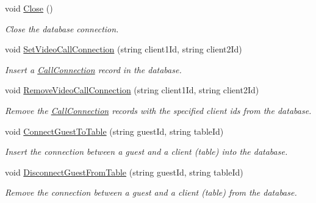 \begin{DoxyCompactItemize}
void \hyperlink{class_e_l_i_server_1_1_database_manager_a7f64bd7fd49cd35e15362d2db5a302e0}{Close} ()
\begin{DoxyCompactList}\small\item\em Close the database connection. \end{DoxyCompactList}\item 
void \hyperlink{class_e_l_i_server_1_1_database_manager_a27bf3444db3446216c2a0c7b957895d9}{Set\+Video\+Call\+Connection} (string client1\+Id, string client2\+Id)
\begin{DoxyCompactList}\small\item\em Insert a \hyperlink{class_e_l_i_server_1_1_call_connection}{Call\+Connection} record in the database. \end{DoxyCompactList}\item 
void \hyperlink{class_e_l_i_server_1_1_database_manager_a8e8315c9b23095cbe799c8f75ccacc87}{Remove\+Video\+Call\+Connection} (string client1\+Id, string client2\+Id)
\begin{DoxyCompactList}\small\item\em Remove the \hyperlink{class_e_l_i_server_1_1_call_connection}{Call\+Connection} records with the specified client ids from the database. \end{DoxyCompactList}\item 
void \hyperlink{class_e_l_i_server_1_1_database_manager_a4167599aa3be67444134c0fd4f837c82}{Connect\+Guest\+To\+Table} (string guest\+Id, string table\+Id)
\begin{DoxyCompactList}\small\item\em Insert the connection between a guest and a client (table) into the database. \end{DoxyCompactList}\item 
void \hyperlink{class_e_l_i_server_1_1_database_manager_a99034ff69cba06942d29a9ad444b04c3}{Disconnect\+Guest\+From\+Table} (string guest\+Id, string table\+Id)
\begin{DoxyCompactList}\small\item\em Remove the connection between a guest and a client (table) from the database. \end{DoxyCompactList}\end{DoxyCompactItemize}
